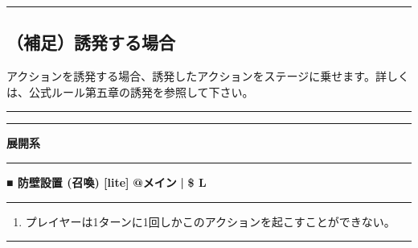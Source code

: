 \documentclass[twocolumn,a5paper,papersize,10pt]{jarticle}
\begin{document}
\vspace{-1zh}%
\hrule height 0.1mm depth 0mm width 66.5mm %
\vspace{-3zh}%

\subsection*{（補足）誘発する場合}
\vspace{-1zh}%
アクションを誘発する場合、誘発したアクションをステージに乗せます。詳しくは、公式ルール第五章の誘発を参照して下さい。
\vspace{-1zh}%


\begin{center}
\begin{center}
\hrule height 1mm depth 0mm width 66.5mm %
\vspace{1mm}%
{\Large\bf {}}
\vspace{1mm}%
\hrule height 0.5mm depth 0mm width 66.5mm %
\end{center}
\end{center}
\vspace{-1zh}%


\begin{tcolorbox}
{\scriptsize\bf 展開系}
\end{tcolorbox}
\vspace{-1zh}%
\vspace{2mm} %
\hrule height 0.5mm depth 0mm width 66.5mm %
\vspace{1mm} %
{\small\bf ■ 防壁設置 {\scriptsize (召喚) [lite]}} %
\hfill 
{\footnotesize\bf @メイン }
  {\footnotesize\bf | } {\footnotesize\bf \$ L}


\vspace{1mm}%
\hrule height 0.1mm depth 0mm width 66.5mm %
\vspace{1mm}%


\vspace{-1zh}%
\begin{enumerate}
\renewcommand{\labelenumi}{※}
\setlength{\leftskip}{-0.3cm}
\setlength{\itemsep}{0pt} %
\setlength{\parskip}{0pt} %

\item プレイヤーは1ターンに1回しかこのアクションを起こすことができない。

\vspace{-3mm}%
\end{enumerate}
\vspace{1mm}%
\hrule height 0.1mm depth 0mm width 66.5mm %
\vspace{1mm}%
\end{document}
